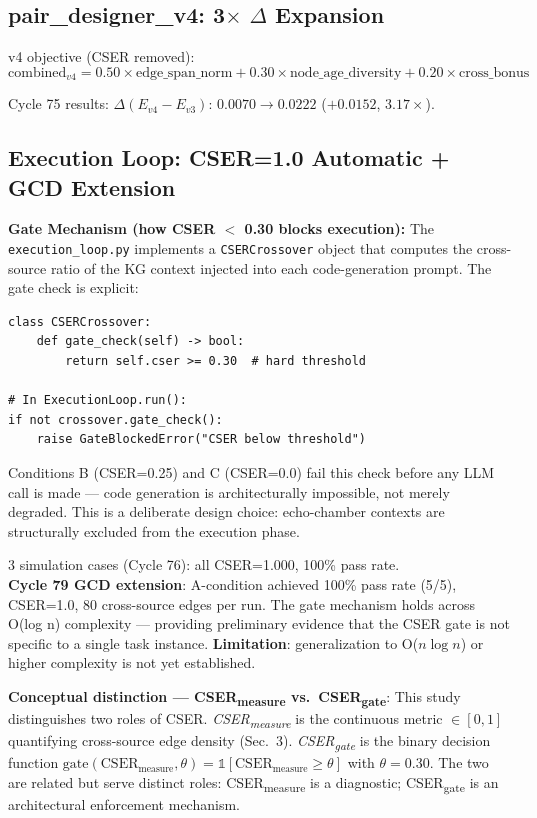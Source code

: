 \documentclass[12pt]{article}
\begin{document}
\subsection{pair\_designer\_v4: 3$\times$ $\Delta$ Expansion}

v4 objective (CSER removed):
\[
  \text{combined}_{v4} = 0.50 \times \text{edge\_span\_norm}
  + 0.30 \times \text{node\_age\_diversity}
  + 0.20 \times \text{cross\_bonus}
\]

Cycle 75 results: $\Delta(E_{v4}-E_{v3})$: $0.0070 \to 0.0222$ ($+0.0152$, $3.17\times$).

\subsection{Execution Loop: CSER=1.0 Automatic + GCD Extension}

\noindent\textbf{Gate Mechanism (how CSER $<$ 0.30 blocks execution):}
The \texttt{execution\_loop.py} implements a \texttt{CSERCrossover} object that
computes the cross-source ratio of the KG context injected into each code-generation
prompt. The gate check is explicit:
\begin{lstlisting}
class CSERCrossover:
    def gate_check(self) -> bool:
        return self.cser >= 0.30  # hard threshold

# In ExecutionLoop.run():
if not crossover.gate_check():
    raise GateBlockedError("CSER below threshold")
\end{lstlisting}
Conditions B (CSER=0.25) and C (CSER=0.0) fail this check before any LLM call is
made --- code generation is architecturally impossible, not merely degraded.
This is a deliberate design choice: echo-chamber contexts are structurally excluded
from the execution phase.

3 simulation cases (Cycle 76): all CSER=1.000, 100\% pass rate. \\
\textbf{Cycle 79 GCD extension}: A-condition achieved 100\% pass rate (5/5), CSER=1.0,
80 cross-source edges per run. The gate mechanism holds across O(log n) complexity ---
providing preliminary evidence that the CSER gate is not specific to a single task instance.
\textbf{Limitation}: generalization to O($n \log n$) or higher complexity is not yet established.

\noindent\textbf{Conceptual distinction --- CSER\textsubscript{measure} vs.\ CSER\textsubscript{gate}}:
This study distinguishes two roles of CSER. \emph{CSER\textsubscript{measure}} is
the continuous metric $\in [0,1]$ quantifying cross-source edge density (Sec.~3).
\emph{CSER\textsubscript{gate}} is the binary decision function
$\text{gate}(\text{CSER}_{\text{measure}}, \theta) = \mathbb{1}[\text{CSER}_{\text{measure}} \geq \theta]$
with $\theta = 0.30$. The two are related but serve distinct roles: CSER\textsubscript{measure}
is a diagnostic; CSER\textsubscript{gate} is an architectural enforcement mechanism.
\end{document}
